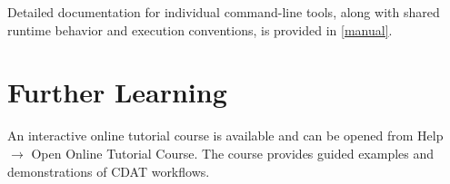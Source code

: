 Detailed documentation for individual command-line tools, along with shared
runtime behavior and execution conventions, is provided in \autoref{manual}.

\section*{Further Learning}

An interactive online tutorial course is available and can be opened
from {\gui Help \(\rightarrow\) Open Online Tutorial Course}. The
course provides guided examples and demonstrations of CDAT workflows.


